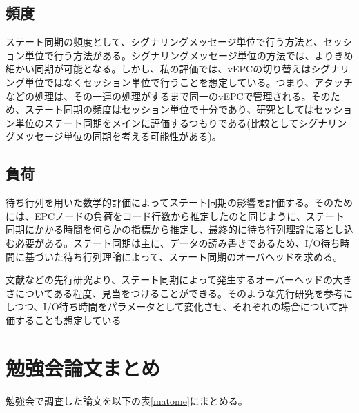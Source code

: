 \documentclass[a4j]{ujarticle}
\begin{document}
\subsection{頻度}
ステート同期の頻度として、シグナリングメッセージ単位で行う方法と、セッション単位で行う方法がある。シグナリングメッセージ単位の方法では、よりきめ細かい同期が可能となる。しかし、私の評価では、vEPCの切り替えはシグナリング単位ではなくセッション単位で行うことを想定している。つまり、アタッチなどの処理は、その一連の処理がするまで同一のvEPCで管理される。そのため、ステート同期の頻度はセッション単位で十分であり、研究としてはセッション単位のステート同期をメインに評価するつもりである(比較としてシグナリングメッセージ単位の同期を考える可能性がある)。
\subsection{負荷}
待ち行列を用いた数学的評価によってステート同期の影響を評価する。そのためには、EPCノードの負荷をコード行数から推定したのと同じように、ステート同期にかかる時間を何らかの指標から推定し、最終的に待ち行列理論に落とし込む必要がある。ステート同期は主に、データの読み書きであるため、I/O待ち時間に基づいた待ち行列理論によって、ステート同期のオーバヘッドを求める。

文献\cite{PerformanceComparisonofStateSynchronizationTechniquesinaDistributedLTEEPC}などの先行研究より、ステート同期によって発生するオーバーヘッドの大きさについてある程度、見当をつけることができる。そのような先行研究を参考にしつつ、I/O待ち時間をパラメータとして変化させ、それぞれの場合について評価することも想定している


\section{勉強会論文まとめ}
勉強会で調査した論文を以下の表\ref{matome}にまとめる。
\end{document}
